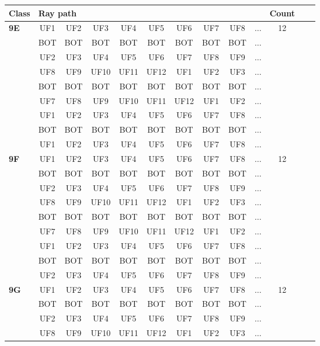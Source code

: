 \begin{table}[h!]
\centering
\begin{tabular}{|l|c|c|c|c|c|c|c|c|c|c|c|c|}
\hline
Class &  \multicolumn{9}{l}{Ray path} \vline  & Count\\
\hline \hline
\textbf{9E} & UF1 & UF2 & UF3 & UF4 & UF5 & UF6 & UF7 & UF8 & $\dots$ & 12\\
 & BOT & BOT & BOT & BOT & BOT & BOT & BOT & BOT & $\dots$ & \\
 & UF2 & UF3 & UF4 & UF5 & UF6 & UF7 & UF8 & UF9 & $\dots$ & \\
 & UF8 & UF9 & UF10 & UF11 & UF12 & UF1 & UF2 & UF3 & $\dots$ & \\
 & BOT & BOT & BOT & BOT & BOT & BOT & BOT & BOT & $\dots$ & \\
 & UF7 & UF8 & UF9 & UF10 & UF11 & UF12 & UF1 & UF2 & $\dots$ & \\
 & UF1 & UF2 & UF3 & UF4 & UF5 & UF6 & UF7 & UF8 & $\dots$ & \\
 & BOT & BOT & BOT & BOT & BOT & BOT & BOT & BOT & $\dots$ & \\
 & UF1 & UF2 & UF3 & UF4 & UF5 & UF6 & UF7 & UF8 & $\dots$ & \\
\hline \hline
\textbf{9F} & UF1 & UF2 & UF3 & UF4 & UF5 & UF6 & UF7 & UF8 & $\dots$ & 12\\
 & BOT & BOT & BOT & BOT & BOT & BOT & BOT & BOT & $\dots$ & \\
 & UF2 & UF3 & UF4 & UF5 & UF6 & UF7 & UF8 & UF9 & $\dots$ & \\
 & UF8 & UF9 & UF10 & UF11 & UF12 & UF1 & UF2 & UF3 & $\dots$ & \\
 & BOT & BOT & BOT & BOT & BOT & BOT & BOT & BOT & $\dots$ & \\
 & UF7 & UF8 & UF9 & UF10 & UF11 & UF12 & UF1 & UF2 & $\dots$ & \\
 & UF1 & UF2 & UF3 & UF4 & UF5 & UF6 & UF7 & UF8 & $\dots$ & \\
 & BOT & BOT & BOT & BOT & BOT & BOT & BOT & BOT & $\dots$ & \\
 & UF2 & UF3 & UF4 & UF5 & UF6 & UF7 & UF8 & UF9 & $\dots$ & \\
\hline \hline
\textbf{9G} & UF1 & UF2 & UF3 & UF4 & UF5 & UF6 & UF7 & UF8 & $\dots$ & 12\\
 & BOT & BOT & BOT & BOT & BOT & BOT & BOT & BOT & $\dots$ & \\
 & UF2 & UF3 & UF4 & UF5 & UF6 & UF7 & UF8 & UF9 & $\dots$ & \\
 & UF8 & UF9 & UF10 & UF11 & UF12 & UF1 & UF2 & UF3 & $\dots$ & \\

\end{tabular}
\end{table}
